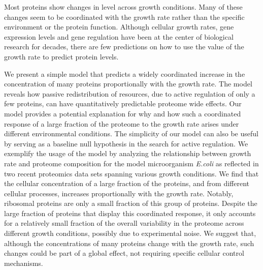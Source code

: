 Most proteins show changes in level across growth conditions.
Many of these changes seem to be coordinated with the growth rate rather than the specific environment or the protein function.
Although cellular growth rates, gene expression levels and gene regulation have been at the center of biological research for decades, there are few predictions on how to use the value of the growth rate to predict protein levels. 

We present a simple model that predicts a widely coordinated increase in the concentration of many proteins proportionally with the growth rate. The model reveals how passive redistribution of resources, due to active regulation of only a few proteins, can have quantitatively predictable proteome wide effects.
Our model provides a potential explanation for why and how such a coordinated response of a large fraction of the proteome to the growth rate arises under different environmental conditions.
The simplicity of our model can also be useful by serving as a baseline null hypothesis in the search for active regulation.
We exemplify the usage of the model by analyzing the relationship between growth rate and proteome composition for the model microorganism \emph{E.coli} as reflected in two recent proteomics data sets spanning various growth conditions.
We find that the cellular concentration of a large fraction of the proteins, and from different cellular processes, increases proportionally with the growth rate. Notably, ribosomal proteins are only a small fraction of this group of proteins.
Despite the large fraction of proteins that display this coordinated response, it only accounts for a relatively small fraction of the overall variability in the proteome across different growth conditions, possibly due to experimental noise.
We suggest that, although the concentrations of many proteins change with the growth rate, such changes could be part of a global effect, not requiring specific cellular control mechanisms.